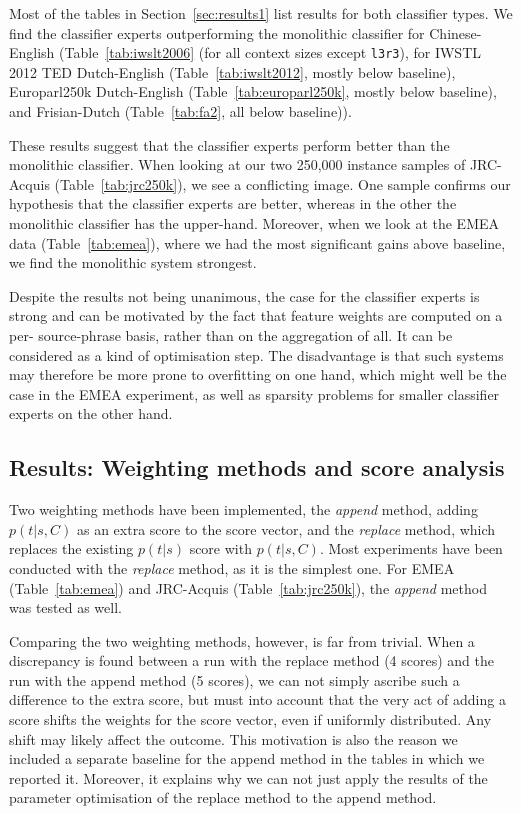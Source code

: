 \documentclass[smallextended]{svjour3}       %
\theoremstyle{break}
\begin{document}
Most of the tables in Section~\ref{sec:results1} list results for both classifier
types.  We find the classifier experts outperforming the monolithic classifier
for Chinese-English (Table~\ref{tab:iwslt2006} (for all context sizes except
\texttt{l3r3}), for  IWSTL 2012 TED Dutch-English (Table~\ref{tab:iwslt2012},
mostly below baseline), Europarl250k Dutch-English
(Table~\ref{tab:europarl250k}, mostly below baseline), and Frisian-Dutch
(Table~\ref{tab:fa2}, all below baseline)).

These results suggest that the classifier experts perform better than the
monolithic classifier. When looking at our two 250,000 instance samples of
JRC-Acquis (Table~\ref{tab:jrc250k}), we see a conflicting image. One sample
confirms our hypothesis that the classifier experts are better, whereas in the
other the monolithic classifier has the upper-hand. Moreover, when we look at
the EMEA data (Table~\ref{tab:emea}), where we had the most significant gains
above baseline, we find the monolithic system strongest. 

Despite the results not being unanimous, the case for the classifier experts is
strong and can be motivated by the fact that feature weights are computed on a per-
source-phrase basis, rather than on the aggregation of all. It can be considered as a
kind of optimisation step. The disadvantage is that such systems may therefore
be more prone to overfitting on one hand, which might well be the case in the
EMEA experiment, as well as sparsity problems for smaller classifier experts on
the other hand.



\subsection{Results: Weighting methods and score analysis}
\label{sec:weighting}

Two weighting methods have been implemented, the \emph{append} method, adding
$p(t|s,C)$ as an extra score to the score vector, and the \emph{replace}
method, which replaces the existing $p(t|s)$ score with $p(t|s,C)$. Most
experiments have been conducted with the \emph{replace} method, as it is the
simplest one. For EMEA (Table~\ref{tab:emea}) and JRC-Acquis
(Table~\ref{tab:jrc250k}), the \emph{append} method was tested as well.

Comparing the two weighting methods, however, is far from trivial. When a
discrepancy is found between a run with the replace method (4 scores) and the
run with the append method (5 scores), we can not simply ascribe such a
difference to the extra score, but must into account that the very act of
adding a score shifts the weights for the score vector, even if uniformly
distributed. Any shift may likely affect the outcome. This
motivation is also the reason we included a separate baseline for the append
method in the tables in which we reported it. Moreover, it explains why we can
not just apply the results of the parameter optimisation of the replace method
to the append method.
\end{document}
